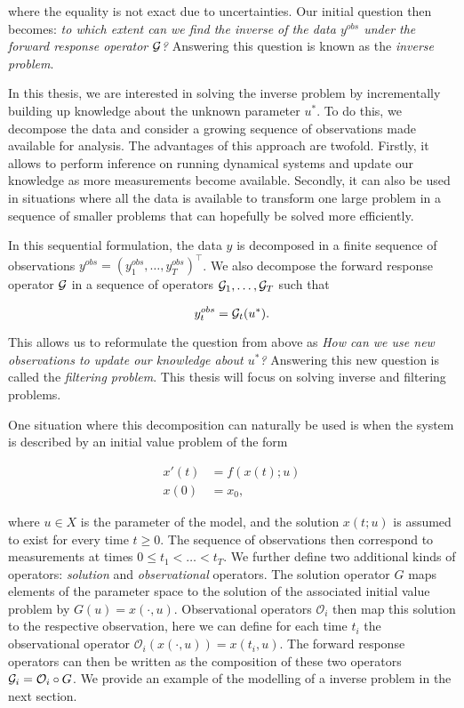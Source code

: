 where the equality is not exact due to uncertainties. Our initial question then becomes: \textit{to which extent can we find the inverse of the data $y^{obs}$ under the forward response operator $\mathcal{G}$?} Answering this question is known as the \textit{inverse problem}.

In this thesis, we are interested in solving the inverse problem by incrementally building up knowledge about the unknown parameter $u^*$. To do this, we decompose the data and consider a growing sequence of observations made available for analysis. The advantages of this approach are twofold. Firstly, it allows to perform inference on running dynamical systems and update our knowledge as more measurements become available. Secondly, it can also be used in situations where all the data is available to transform one large problem in a sequence of smaller problems that can hopefully be solved more efficiently.

In this sequential formulation, the data $y$ is decomposed in a finite sequence of observations $y^{obs} = (y^{obs}_1, \ldots, y^{obs}_T)^\top$. We also decompose the forward response operator $\mathcal{G}$ in a sequence of operators $\mathcal{G}_1, \ldots, \mathcal{G}_T$ such that

\begin{equation*}
  y^{obs}_t = \mathcal{G}_t(u^*).
\end{equation*}

This allows us to reformulate the question from above as \textit{How can we use new observations to update our knowledge about $u^*$?} Answering this new question is called the \textit{filtering problem}. This thesis will focus on solving inverse and filtering problems.

One situation where this decomposition can naturally be used is when the system is described by an initial value problem of the form

\begin{equation}
  \begin{aligned}
    x'(t) &= f(x(t); u)\\
    x(0) &= x_0,
  \end{aligned}
\end{equation}  

where $u \in X$ is the parameter of the model, and the solution $x(t; u)$ is assumed to exist for every time $t \geq 0$. The sequence of observations then correspond to measurements at times  $0 \leq t_1 < \ldots < t_T$. We further define two additional kinds of operators: \textit{solution} and \textit{observational} operators. The solution operator $G$ maps elements of the parameter space to the solution of the associated initial value problem by $G(u) = x(\cdot, u)$. Observational operators $\mathcal{O}_i$ then map this solution to the respective observation, here we can define for each time $t_i$ the observational operator $\mathcal{O}_i(x(\cdot, u)) = x(t_i, u)$. The forward response operators can then be written as the composition of these two operators $\mathcal{G}_i = \mathcal{O}_i \circ G$. We provide an example of the modelling of a inverse problem in the next section.

